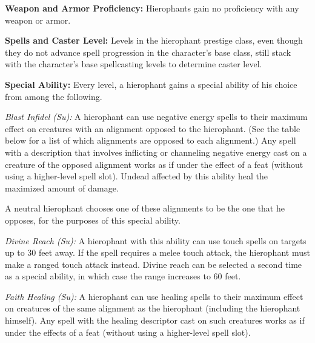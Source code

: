 {
\textbf{Weapon and Armor Proficiency:} Hierophants gain no proficiency with any weapon or armor.

\textbf{Spells and Caster Level:} Levels in the hierophant prestige class, even though they do not advance spell progression in the character's base class, still stack with the character's base spellcasting levels to determine caster level.

\textbf{Special Ability:} Every level, a hierophant gains a special ability of his choice from among the following.

\textit{Blast Infidel (Su):} A hierophant can use negative energy spells to their maximum effect on creatures with an alignment opposed to the hierophant. (See the table below for a list of which alignments are opposed to each alignment.) Any spell with a description that involves inflicting or channeling negative energy cast on a creature of the opposed alignment works as if under the effect of a  feat (without using a higher-level spell slot). Undead affected by this ability heal the maximized amount of damage.

A neutral hierophant chooses one of these alignments to be the one that he opposes, for the purposes of this special ability.


\textit{Divine Reach (Su):} A hierophant with this ability can use touch spells on targets up to 30 feet away. If the spell requires a melee touch attack, the hierophant must make a ranged touch attack instead. Divine reach can be selected a second time as a special ability, in which case the range increases to 60 feet.

\textit{Faith Healing (Su):} A hierophant can use healing spells to their maximum effect on creatures of the same alignment as the hierophant (including the hierophant himself). Any spell with the healing descriptor cast on such creatures works as if under the effects of a  feat (without using a higher-level spell slot).

}
